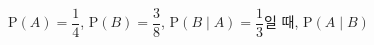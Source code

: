 $\mathrm{P}(A)=\dfrac{1}{4}$, $\mathrm{P}(B)=\dfrac{3}{8}$, $\mathrm{P}(B\mid A)=\dfrac{1}{3}$일 때, $\mathrm{P}(A\mid B)$
